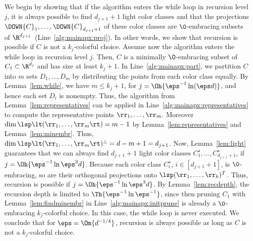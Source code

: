 \begin{prf}
We begin by showing that if the algorithm enters the while 
loop in recursion level $j$, it is always possible to find $d_{j+1}
+ 1$ light color classes and that the projections
$\DOWN{C}_1,\dots,\DOWN{C}_{d_{j+1}+1}$ of these color
classes are $\0$-embracing subsets of 
$\R^{d_{j+1}}$~(Line~\ref{alg:mainapx:proj}). In other words, we show
that recursion is possible if $C$ is not a $k_j$-colorful choice.
Assume now the algorithm enters the while loop in recursion level $j$.
Then, $C$ is a minimally $\0$-embracing subset of 
$C_1 \subset \R^{d_j}$ and has size at least $k_j+1$. In
Line~\ref{alg:mainapx:part}, we partition $C$ into $m$ sets 
$D_1,\dots,D_m$ by distributing the points from each color class equally. 
By Lemma~\ref{lem:while}, we have $m\leq k_j + 1$, 
for $j = \Oh{\eps^{-1} \ln (\eps d)}$,
and hence each set $D_i$ is nonempty. Thus,
the algorithm from Lemma~\ref{lem:representatives} can be applied in
Line~\ref{alg:mainapx:representatives}
to compute the representative points $\rr_1,\dots,\rr_m$. Moreover $\dim
\lsp\lt(\rr_1,\dots,\rr_m\rt) = m-1$ by Lemma~\ref{lem:representatives} and
Lemma~\ref{lem:minembr}.
Thus, $\dim \lsp\lt(\rr_1,\dots,\rr_m\rt)^\perp = d - m + 1 = d_{j+1}$.
Now, Lemma~\ref{lem:light} guarantees that we can always find $d_{j+1}+1$ 
light color classes $C^\star_1,\dots,C^\star_{d_{j+1}+1}$, 
if $j = \Oh{\eps^{-1} \ln \eps^3 d}$. Because each color 
class $C^\star_i$, $i \in [d_{j+1}+1]$, is
$\0$-embracing, so are their orthogonal projections onto
$\lsp(\rr_1,\dots,\rr_k)^T$. Thus, recursion is possible 
if $j = \Oh{\eps^{-1} \ln \eps^3 d}$. By Lemma~\ref{lem:recdepth}, 
the recursion depth is limited to
$\Th{\eps^{-1} \ln \eps^{-1}}$, since then pruning $C_1$ with
Lemma~\ref{lem:findminembr} in Line~\ref{alg:mainapx:initprune} is already a
$\0$-embracing $k_j$-colorful choice. In this case, the while loop is never
executed. We conclude that for $\eps = \Om{d^{-1/4}}$, recursion is always
possible as long as $C$ is not a $k_j$-colorful choice.



\end{prf}
